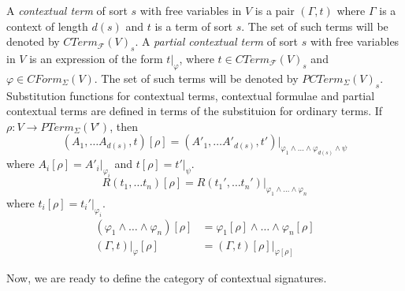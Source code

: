 \documentclass{amsart}
\theoremstyle{definition}
\theoremstyle{remark}
\numberwithin{figure}{section}
\begin{document}
A \emph{contextual term} of sort $s$ with free variables in $V$ is a pair $(\Gamma,t)$ where $\Gamma$ is a context of length $d(s)$ and $t$ is a term of sort $s$.
The set of such terms will be denoted by $CTerm_\mathcal{F}(V)_s$.
A \emph{partial contextual term} of sort $s$ with free variables in $V$ is an expression of the form $t|_\varphi$,
where $t \in CTerm_\mathcal{F}(V)_s$ and $\varphi \in CForm_\Sigma(V)$.
The set of such terms will be denoted by $PCTerm_\Sigma(V)_s$.
Substitution functions for contextual terms, contextual formulae and partial contextual terms are defined in terms of the substituion for ordinary terms.
If $\rho : V \to PTerm_\Sigma(V')$, then
\[ (A_1, \ldots A_{d(s)}, t)[\rho] = (A'_1, \ldots A'_{d(s)}, t')|_{\varphi_1 \land \ldots \land \varphi_{d(s)} \land \psi} \]
where $A_i[\rho] = A'_i|_{\varphi_i}$ and $t[\rho] = t'|_\psi$.
\[ R(t_1, \ldots t_n)[\rho] = R(t_1', \ldots t_n')|_{\varphi_1 \land \ldots \land \varphi_n} \]
where $t_i[\rho] = t_i'|_{\varphi_i}$.
\begin{align*}
(\varphi_1 \land \ldots \land \varphi_n)[\rho] & = \varphi_1[\rho] \land \ldots \land \varphi_n[\rho] \\
(\Gamma,t)|_\varphi[\rho] & = (\Gamma,t)[\rho]|_{\varphi[\rho]}
\end{align*}

Now, we are ready to define the category of contextual signatures.
\end{document}
